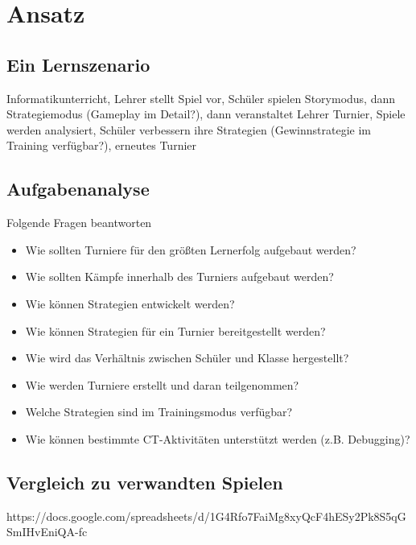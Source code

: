 \chapter{Ansatz}

\section{Ein Lernszenario}

Informatikunterricht, Lehrer stellt Spiel vor, Schüler spielen Storymodus, dann Strategiemodus
(Gameplay im Detail?), dann veranstaltet Lehrer Turnier, Spiele werden analysiert, Schüler
verbessern ihre Strategien (Gewinnstrategie im Training verfügbar?), erneutes Turnier

\section{Aufgabenanalyse}

Folgende Fragen beantworten

\begin{itemize}
\item Wie sollten Turniere für den größten Lernerfolg aufgebaut werden?
\item Wie sollten Kämpfe innerhalb des Turniers aufgebaut werden?
\item Wie können Strategien entwickelt werden?
\item Wie können Strategien für ein Turnier bereitgestellt werden?
\item Wie wird das Verhältnis zwischen Schüler und Klasse hergestellt?
\item Wie werden Turniere erstellt und daran teilgenommen?
\item Welche Strategien sind im Trainingsmodus verfügbar?
\item Wie können bestimmte CT-Aktivitäten unterstützt werden (z.B. Debugging)?
\end{itemize}

\section{Vergleich zu verwandten Spielen}

https://docs.google.com/spreadsheets/d/1G4Rfo7FaiMg8xyQcF4hESy2Pk8S5qGSmIHvEniQA-fc

